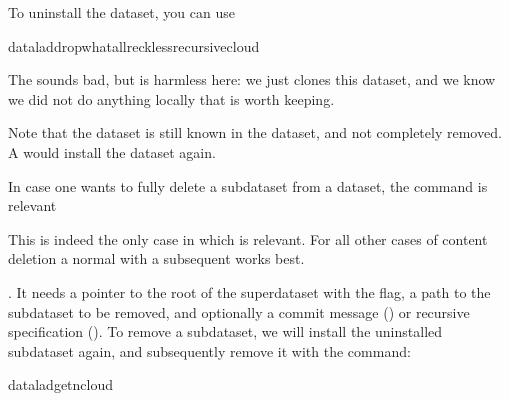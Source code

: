 \sphinxAtStartPar
To uninstall the dataset, you can use

\begin{sphinxVerbatim}[commandchars=\\\{\}]
dataladdrop\PYGZhy{}\PYGZhy{}whatall\PYGZhy{}\PYGZhy{}reckless\PYGZhy{}\PYGZhy{}recursivecloud
\end{sphinxVerbatim}

\sphinxAtStartPar
The  sounds bad, but is harmless here: we just clones this dataset, and we know we did not do anything locally that is worth keeping.

\sphinxAtStartPar
Note that the dataset is still known in the dataset, and not completely removed.
A  would install the dataset again.

\ignorespaces 
\sphinxAtStartPar
In case one wants to fully delete a subdataset from a dataset, the
 command is relevant%
\begin{footnote}\sphinxAtStartFootnote
This is indeed the only case in which  is
relevant. For all other cases of content deletion a normal 
with a subsequent  works best.
%
\end{footnote}.
It needs a pointer to the root of the superdataset with the 
flag, a path to the subdataset to be removed, and optionally a commit message
() or recursive specification ().
To remove a subdataset, we will install the uninstalled subdataset again, and
subsequently remove it with the  command:

\begin{sphinxVerbatim}[commandchars=\\\{\}]
dataladget\PYGZhy{}ncloud
\end{sphinxVerbatim}

